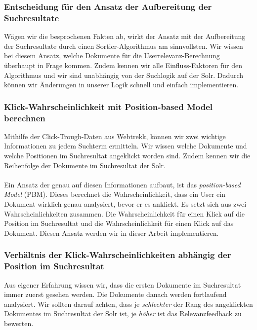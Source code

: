 \subsubsection{Entscheidung für den Ansatz der Aufbereitung der Suchresultate}
\label{sec:Einfuehrung:Methodik:SucheEinbinden:Entscheidung}

Wägen wir die besprochenen Fakten ab, wirkt der Ansatz mit der Aufbereitung der Suchresultate durch einen Sortier-Algorithmus am sinnvollsten. Wir wissen bei diesem Ansatz, welche Dokumente für die Userrelevanz-Berechnung überhaupt in Frage kommen. Zudem kennen wir alle Einfluss-Faktoren für den Algorithmus und wir sind unabhängig von der Suchlogik auf der Solr. Dadurch können wir Änderungen in unserer Logik schnell und einfach implementieren.

\subsubsection{Klick-Wahrscheinlichkeit mit Position-based Model berechnen}
\label{sec:Einfuehrung:Methodik:SucheEinbinden:PBM}

Mithilfe der Click-Trough-Daten aus Webtrekk, können wir zwei wichtige Informationen zu jedem Suchterm ermitteln. Wir wissen welche Dokumente und welche Positionen im Suchresultat angeklickt worden sind. Zudem kennen wir die Reihenfolge der Dokumente im Suchresultat der Solr.
\\
\\
Ein Ansatz der genau auf diesen Informationen aufbaut, ist das \textit{position-based Model} (PBM)\cite{chuklin2015}. Dieses berechnet die Wahrscheinlichkeit, dass ein User ein Dokument wirklich genau analysiert, bevor er es anklickt. Es setzt sich aus zwei Wahrscheinlichkeiten zusammen. Die Wahrscheinlichkeit für einen Klick auf die Position im Suchresultat und die Wahrscheinlichkeit für einen Klick auf das Dokument. Diesen Ansatz werden wir in dieser Arbeit implementieren.

\subsubsection{Verhältnis der Klick-Wahrscheinlichkeiten abhängig der Position im Suchresultat}
\label{sec:Einfuehrung:Methodik:SucheEinbinden:PBM}

Aus eigener Erfahrung wissen wir, dass die ersten Dokumente im Suchresultat immer zuerst gesehen werden. Die Dokumente danach werden fortlaufend analysiert. Wir sollten darauf achten, dass je \textit{schlechter} der Rang des angeklickten Dokumentes im Suchresultat der Solr ist, je \textit{höher} ist das Relevanzfeedback zu bewerten.


